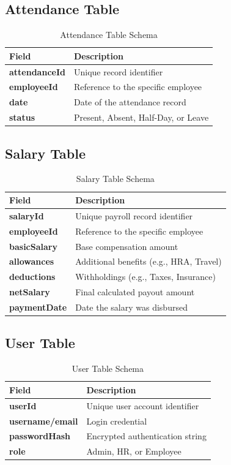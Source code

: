 \documentclass[12pt,a4paper]{report}
\begin{document}
\subsection{Attendance Table}
\begin{table}[h!]
\centering
{}
\begin{tabularx}{\textwidth}{>{\bfseries}lX}
\toprule
\rowcolor{lightblue}
\textbf{Field} & \textbf{Description} \\
\midrule
attendanceId & Unique record identifier \\
employeeId   & Reference to the specific employee \\
date         & Date of the attendance record \\
status       & Present, Absent, Half-Day, or Leave \\
\bottomrule
\end{tabularx}
\caption{Attendance Table Schema}
\end{table}

\subsection{Salary Table}
\begin{table}[h!]
\centering
{}
\begin{tabularx}{\textwidth}{>{\bfseries}lX}
\toprule
\rowcolor{lightblue}
\textbf{Field} & \textbf{Description} \\
\midrule
salaryId     & Unique payroll record identifier \\
employeeId   & Reference to the specific employee \\
basicSalary  & Base compensation amount \\
allowances   & Additional benefits (e.g., HRA, Travel) \\
deductions   & Withholdings (e.g., Taxes, Insurance) \\
netSalary    & Final calculated payout amount \\
paymentDate  & Date the salary was disbursed \\
\bottomrule
\end{tabularx}
\caption{Salary Table Schema}
\end{table}

\subsection{User Table}
\begin{table}[h!]
\centering
{}
\begin{tabularx}{\textwidth}{>{\bfseries}lX}
\toprule
\rowcolor{lightblue}
\textbf{Field} & \textbf{Description} \\
\midrule
userId         & Unique user account identifier \\
username/email & Login credential \\
passwordHash   & Encrypted authentication string \\
role           & Admin, HR, or Employee \\
\bottomrule
\end{tabularx}
\caption{User Table Schema}
\end{table}
\end{document}
